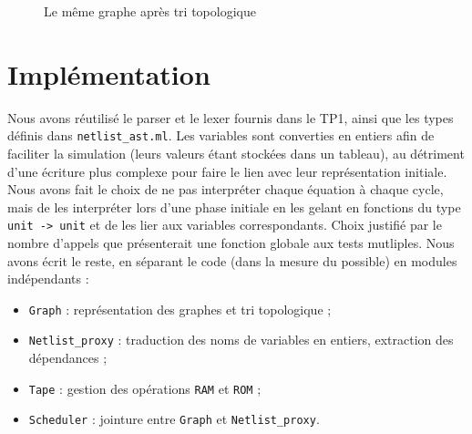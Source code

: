 \documentclass[a4paper]{article}
\begin{document}
\begin{figure}[h]
    \centering
{}
\caption{Le même graphe après tri topologique}
\end{figure}


\section{Implémentation}

Nous avons réutilisé le parser et le lexer fournis dans le TP1, ainsi que les types définis dans \texttt{netlist\_ast.ml}.
Les variables sont converties en entiers afin de faciliter la simulation (leurs valeurs étant stockées dans un tableau), au détriment d'une écriture plus complexe pour faire le lien avec leur représentation initiale.
Nous avons fait le choix de ne pas interpréter chaque équation à chaque cycle, mais de les interpréter lors d'une phase initiale en les gelant en fonctions du type \texttt{unit -> unit} et de les lier aux variables correspondants. Choix justifié par le nombre d'appels que présenterait une fonction globale aux tests mutliples.
Nous avons écrit le reste, en séparant le code (dans la mesure du possible) en modules indépendants :
\begin{itemize}
    \item \texttt{Graph} : représentation des graphes et tri topologique ;
    \item \texttt{Netlist\_proxy} : traduction des noms de variables en entiers, extraction des dépendances ;
    \item \texttt{Tape} : gestion des opérations \texttt{RAM} et \texttt{ROM} ;
    \item \texttt{Scheduler} : jointure entre \texttt{Graph} et \texttt{Netlist\_proxy}.
\end{itemize}
\end{document}

